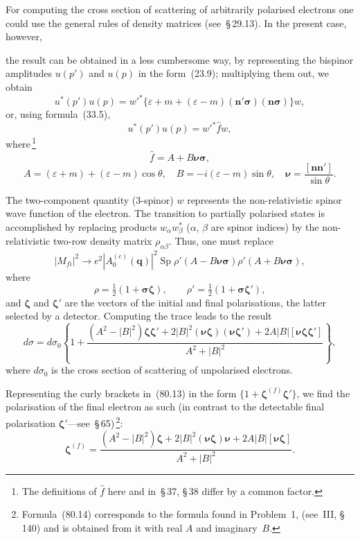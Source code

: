 For computing the cross section of scattering of arbitrarily polarised electrons one could use the general rules of density matrices (see~\S\,29.13). In the present case, however,

the result can be obtained in a less cumbersome way, by representing the bispinor amplitudes $u(p')$ and $u(p)$ in the form~(23.9); multiplying them out, we obtain
\[
u^*(p')u(p) = w'^*\{\varepsilon + m + (\varepsilon - m)(\mathbf{n}'\boldsymbol{\sigma})(\mathbf{n}\boldsymbol{\sigma})\}w,
\]
or, using formula~(33.5),
\begin{equation}
u^*(p')u(p) = w'^*\hat{f}w,
\tag{80.11}
\end{equation}
where\,\footnote{The definitions of $\hat{f}$ here and in~\S\,37, \S\,38 differ by a common factor.}
\begin{equation}
\hat{f} = A + B\boldsymbol{\nu}\boldsymbol{\sigma},
\tag{80.12}
\end{equation}
\[
A = (\varepsilon + m) + (\varepsilon - m)\cos\theta,\quad B = -i(\varepsilon - m)\sin\theta,\quad \boldsymbol{\nu} = \frac{[\mathbf{n}\mathbf{n}']}{{\sin\theta}}.
\]

The two-component quantity (3-spinor) $w$ represents the non-relativistic spinor wave function of the electron. The transition to partially polarised states is accomplished by replacing products $w_\alpha w^*_\beta$ ($\alpha$, $\beta$ are spinor indices) by the non-relativistic two-row density matrix $\rho_{\alpha\beta}$.
Thus, one must replace
\[
|M_{fi}|^2 \to e^2|A_0^{(e)}(\mathbf{q})|^2\operatorname{Sp}\rho'(A - B\boldsymbol{\nu}\boldsymbol{\sigma})\rho'(A + B\boldsymbol{\nu}\boldsymbol{\sigma}),
\]
where
\[
\rho = \tfrac{1}{2}(1 + \boldsymbol{\sigma}\boldsymbol{\zeta}),\qquad \rho' = \tfrac{1}{2}(1 + \boldsymbol{\sigma}\boldsymbol{\zeta}'),
\]
and $\boldsymbol{\zeta}$ and $\boldsymbol{\zeta}'$ are the vectors of the initial and final polarisations, the latter selected by a detector. Computing the trace leads to the result
\begin{equation}
d\sigma = d\sigma_0\left\{1 + \frac{(A^2 - |B|^2)\boldsymbol{\zeta}\boldsymbol{\zeta}' + 2|B|^2(\boldsymbol{\nu}\boldsymbol{\zeta})(\boldsymbol{\nu}\boldsymbol{\zeta}') + 2A|B|[\boldsymbol{\nu}\boldsymbol{\zeta}\boldsymbol{\zeta}']}{A^2 + |B|^2}\right\},
\tag{80.13}
\end{equation}
where $d\sigma_0$ is the cross section of scattering of unpolarised electrons.

Representing the curly brackets in~(80.13) in the form $\{1 + \boldsymbol{\zeta}^{(f)}\boldsymbol{\zeta}'\}$, we find the polarisation of the final electron as such (in contrast to the detectable final polarisation $\boldsymbol{\zeta}'$---see~\S\,65)\,\footnote{Formula~(80.14) corresponds to the formula found in Problem~1, (see~III, \S\,140) and is obtained from it with real $A$ and imaginary~$B$.}:
\begin{equation}
\boldsymbol{\zeta}^{(f)} = \frac{(A^2 - |B|^2)\boldsymbol{\zeta} + 2|B|^2(\boldsymbol{\nu}\boldsymbol{\zeta})\boldsymbol{\nu} + 2A|B|[\boldsymbol{\nu}\boldsymbol{\zeta}]}{A^2 + |B|^2}.
\tag{80.14}
\end{equation}

